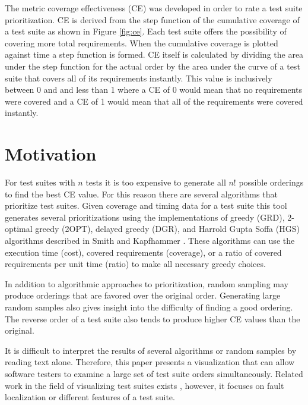 \documentclass{vgtc}                          %
\begin{document}
The metric coverage effectiveness (CE) \cite{ce} was developed in order to rate a test suite prioritization.  CE is derived from the step function of the cumulative coverage of a test suite as shown in Figure \ref{fig:ce}.  Each test suite offers the possibility of covering more total requirements.  When the cumulative coverage is plotted against time a step function is formed.  CE itself is calculated by dividing the area under the step function for the actual order by the area under the curve of a test suite that covers all of its requirements instantly.  This value is inclusively between 0 and and less than 1 where a CE of 0 would mean that no requirements were covered and a CE of 1 would mean that all of the requirements were covered instantly.

\section{Motivation}

For test suites with $n$ tests it is too expensive to generate all $n!\!$ possible orderings to find the best CE value.  For this reason there are several algorithms that prioritize test suites.  Given coverage and timing data for a test suite this tool generates several prioritizations using the implementations of greedy (GRD), 2-optimal greedy (2OPT), delayed greedy (DGR), and Harrold Gupta Soffa (HGS) algorithms described in Smith and Kapfhammer \cite{smith:2009}.  These algorithms can use the execution time (cost), covered requirements (coverage), or a ratio of covered requirements per unit time (ratio) to make all necessary greedy choices.

In addition to algorithmic approaches to prioritization, random sampling may produce orderings that are favored over the original order.  Generating large random samples also gives insight into the difficulty of finding a good ordering.  The reverse order of a test suite also tends to produce higher CE values than the original. %

It is difficult to interpret the results of several algorithms or random samples by reading text alone.  Therefore, this paper presents a visualization that can allow software testers to examine a large set of test suite orders simultaneously.   Related work in the field of visualizing test suites exists \cite{bart} \cite{tarantula}, however, it focuses on fault localization or different features of a test suite.
\end{document}
